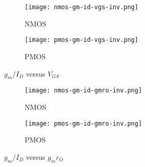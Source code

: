 \documentclass[../main.tex]{subfiles}
\begin{document}
\begin{figure}[H]
    \centering
    \begin{subfigure}{0.5\textwidth}
      \centering
      \texttt{[image: nmos-gm-id-vgs-inv.png]}
      \caption{NMOS}
    \end{subfigure}%
    \begin{subfigure}{0.5\textwidth}
      \centering
      \texttt{[image: pmos-gm-id-vgs-inv.png]}
      \caption{PMOS}
    \end{subfigure}
    \caption{$g_m/I_D$ versus $V_{GS}$}
\end{figure}

\begin{figure}[H]
    \centering
    \begin{subfigure}{0.5\textwidth}
      \centering
      \texttt{[image: nmos-gm-id-gmro-inv.png]}
      \caption{NMOS}
    \end{subfigure}%
    \begin{subfigure}{0.5\textwidth}
      \centering
      \texttt{[image: pmos-gm-id-gmro-inv.png]}
      \caption{PMOS}
    \end{subfigure}
    \caption{$g_m/I_D$ versus $g_m r_O$}
\end{figure}

\pagebreak
\end{document}
